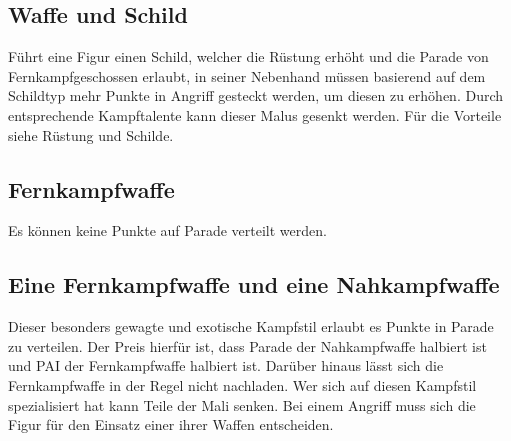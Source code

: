 \documentclass[a4paper,12pt,oneside]{book}
\begin{document}
\subsection{Waffe und Schild}
Führt eine Figur einen Schild, welcher die Rüstung erhöht und die Parade von Fernkampfgeschossen erlaubt, in seiner Nebenhand müssen basierend auf dem Schildtyp mehr Punkte in Angriff gesteckt werden, um diesen zu erhöhen. Durch entsprechende Kampftalente kann dieser Malus gesenkt werden. Für die Vorteile siehe Rüstung und Schilde.

\subsection{Fernkampfwaffe}
Es können keine Punkte auf Parade verteilt werden. 

\subsection{Eine Fernkampfwaffe und eine Nahkampfwaffe}
Dieser besonders gewagte und exotische Kampfstil erlaubt es Punkte in Parade zu verteilen. Der Preis hierfür ist, dass Parade der Nahkampfwaffe halbiert ist und PAI der Fernkampfwaffe halbiert ist. Darüber hinaus lässt
sich die Fernkampfwaffe in der Regel nicht nachladen. Wer sich auf diesen Kampfstil spezialisiert hat kann Teile der Mali senken. Bei einem Angriff muss sich die Figur für den Einsatz einer ihrer Waffen entscheiden.
\end{document}
